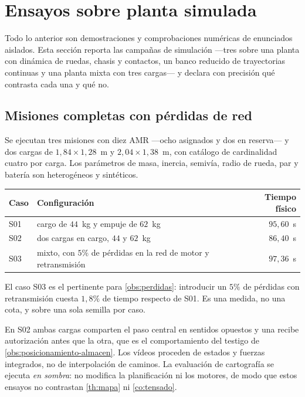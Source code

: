 \section{Ensayos sobre planta simulada}
\label{sec:ensayos}

Todo lo anterior son demostraciones y comprobaciones numéricas de enunciados
aislados. Esta sección reporta las campañas de simulación —tres sobre una planta
con dinámica de ruedas, chasis y contactos, un banco reducido de trayectorias
continuas y una planta mixta con tres cargas— y declara con precisión qué
contrasta cada una y qué no.

\subsection{Misiones completas con pérdidas de red}

\begin{observacion}
\label{obs:ensayo-misiones}
Se ejecutan tres misiones con diez AMR —ocho asignados y dos en reserva— y dos
cargas de $1{,}84\times1{,}28$~m y $2{,}04\times1{,}38$~m, con catálogo de
cardinalidad cuatro por carga. Los parámetros de masa, inercia, semivía, radio de
rueda, par y batería son heterogéneos y sintéticos.

\begin{center}\small
\begin{tabular}{@{}llr@{}}
\toprule
Caso & Configuración & Tiempo físico \\
\midrule
S01 & \textsf{cargo} de $44$~kg y empuje de $62$~kg & $95{,}60$~s \\
S02 & dos cargas en \textsf{cargo}, $44$ y $62$~kg & $86{,}40$~s \\
S03 & mixto, con $5\%$ de pérdidas en la red de motor y retransmisión
  & $97{,}36$~s \\
\bottomrule
\end{tabular}
\end{center}

El caso S03 es el pertinente para \cref{obs:perdidas}: introducir un $5\%$ de
pérdidas con retransmisión cuesta $1{,}8\%$ de tiempo respecto de S01. Es una
medida, no una cota, y sobre una sola semilla por caso.

En S02 ambas cargas comparten el paso central en sentidos opuestos y una recibe
autorización antes que la otra, que es el comportamiento del testigo de
\cref{obs:posicionamiento-almacen}. Los vídeos proceden de estados y fuerzas
integrados, no de interpolación de caminos. La evaluación de cartografía se
ejecuta \emph{en sombra}: no modifica la planificación ni los motores, de modo
que estos ensayos no contrastan \cref{th:mapa} ni \cref{co:tensado}.
\end{observacion}

